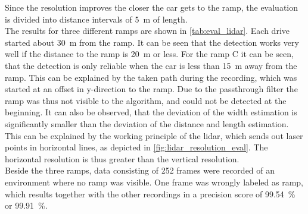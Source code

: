 Since the resolution improves the closer the car gets to the ramp, the evaluation is divided into distance intervals of \SI{5}{\metre} of length.\\
The results for three different ramps are shown in \cref{tab:eval_lidar}.
Each drive started about \SI{30}{\metre} from the ramp.
It can be seen that the detection works very well if the distance to the ramp is \SI{20}{\metre} or less.
For the ramp C it can be seen, that the detection is only reliable when the car is less than \SI{15}{\metre} away from the ramp.
This can be explained by the taken path during the recording, which was started at an offset in y-direction to the ramp.
Due to the passthrough filter the ramp was thus not visible to the algorithm, and could not be detected at the beginning.
It can also be observed, that the deviation of the width estimation is significantly smaller than the deviation of the distance and length estimation.
This can be explained by the working principle of the \gls{lidar}, which sends out laser points in horizontal lines, as depicted in \cref{fig:lidar_resolution_eval}.
The horizontal resolution is thus greater than the vertical resolution.\\
Beside the three ramps, data consisting of 252 frames were recorded of an environment where no ramp was visible.
One frame was wrongly labeled as ramp, which results together with the other recordings in a precision score of \SI{99.54}{\percent} or \SI{99.91}{\percent}.
